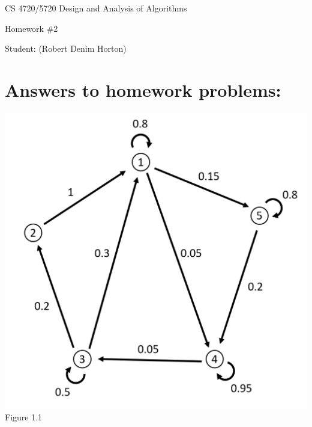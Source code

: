 \documentclass[11pt]{article}
\begin{document}
 

\rhead{\today}

\begin{center}\begin{Large}
CS 4720/5720 Design and Analysis of Algorithms

Homework \#2

Student: (Robert Denim Horton)
\end{Large}
\end{center}

\section*{Answers to homework problems:}

\begin{center}
	\includegraphics[scale=0.8]{Figure1.1}\\
	Figure 1.1
\end{center}
\end{document}
